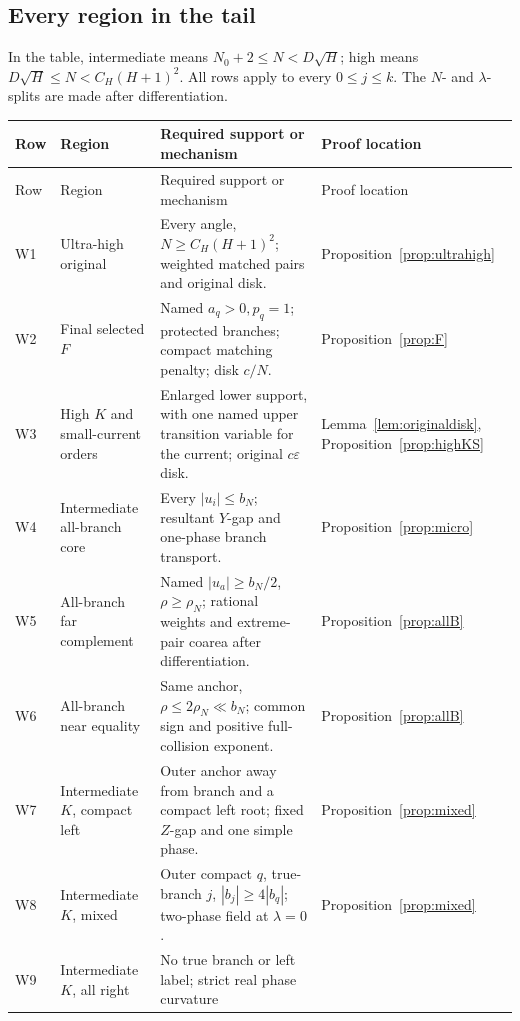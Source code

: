 \documentclass[11pt]{article}
\numberwithin{equation}{section}
\theoremstyle{definition}
\newcommand{\eps}{\varepsilon}
\begin{document}
\subsection{Every region in the tail}
In the table, intermediate means \(N_0+2\le N<D\sqrt H\);
high means \(D\sqrt H\le N<C_H(H+1)^2\).
All rows apply to every \(0\le j\le k\). The \(N\)- and
\(\lambda\)-splits are made after differentiation.
\small
\begin{longtable}{>{\raggedright\arraybackslash}p{}>{\raggedright\arraybackslash}p{}>{\raggedright\arraybackslash}p{}>{\raggedright\arraybackslash}p{}}
\toprule
Row & Region & Required support or mechanism & Proof location\\
\midrule
\endfirsthead
\toprule
Row & Region & Required support or mechanism & Proof location\\
\midrule
\endhead
W1 & Ultra-high original &
Every angle, \(N\ge C_H(H+1)^2\); weighted matched pairs and
original disk. & Proposition~\ref{prop:ultrahigh}\\
W2 & Final selected \(F\) &
Named \(a_q>0,p_q=1\); protected branches; compact matching
penalty; disk \(c/N\). & Proposition~\ref{prop:F}\\
W3 & High \(K\) and small-current orders &
Enlarged lower support, with one named upper transition
variable for the current; original \(c\eps\) disk. &
Lemma~\ref{lem:originaldisk}, Proposition~\ref{prop:highKS}\\
W4 & Intermediate all-branch core &
Every \(|u_i|\le b_N\); resultant \(Y\)-gap and one-phase
branch transport. & Proposition~\ref{prop:micro}\\
W5 & All-branch far complement &
Named \(|u_a|\ge b_N/2\), \(\rho\ge\rho_N\); rational
weights and extreme-pair coarea after differentiation. &
Proposition~\ref{prop:allB}\\
W6 & All-branch near equality &
Same anchor, \(\rho\le2\rho_N\ll b_N\); common sign and
positive full-collision exponent. & Proposition~\ref{prop:allB}\\
W7 & Intermediate \(K\), compact left &
Outer anchor away from branch and a compact left root;
fixed \(Z\)-gap and one simple phase. & Proposition~\ref{prop:mixed}\\
W8 & Intermediate \(K\), mixed &
Outer compact \(q\), true-branch \(j\), \(|b_j|\ge4|b_q|\);
two-phase field at \(\lambda=0\). & Proposition~\ref{prop:mixed}\\
W9 & Intermediate \(K\), all right &
No true branch or left label; strict real phase curvature

\end{longtable}
\end{document}
